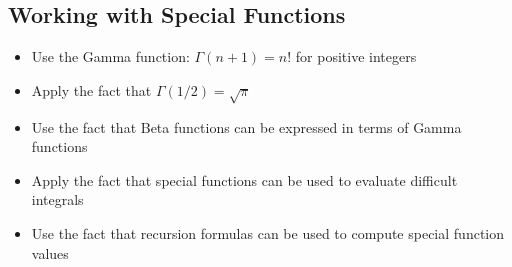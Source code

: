 \subsection*{Working with Special Functions}
\begin{itemize}
\item Use the Gamma function: $\Gamma(n+1) = n!$ for positive integers
\item Apply the fact that $\Gamma(1/2) = \sqrt{\pi}$
\item Use the fact that Beta functions can be expressed in terms of Gamma functions
\item Apply the fact that special functions can be used to evaluate difficult integrals
\item Use the fact that recursion formulas can be used to compute special function values
\end{itemize}